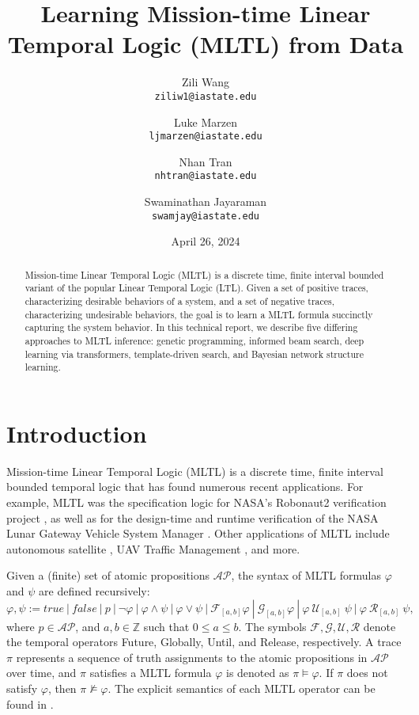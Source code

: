 \documentclass[12pt]{article}
\renewcommand{\phi}{\varphi}
\newcommand{\Until}{\ \mathcal{U}}         %
\newcommand{\Release}{\ \mathcal{R}}       %
\newcommand{\Globally}{\mathcal{G}}          %
\newcommand{\Finally}{\mathcal{F}}           %
\begin{document}
\title{\bf
\large Learning Mission-time Linear Temporal Logic (MLTL) from Data}

\author{
  Zili Wang\\
  \texttt{ziliw1@iastate.edu}
  \and
  Luke Marzen\\
  \texttt{ljmarzen@iastate.edu}
  \and
  Nhan Tran\\
  \texttt{nhtran@iastate.edu}
  \and
  Swaminathan Jayaraman\\
  \texttt{swamjay@iastate.edu}
}

\date{April 26, 2024}

\maketitle

\begin{abstract}
  Mission-time Linear Temporal Logic (MLTL) is a discrete time, finite interval bounded variant of the popular Linear Temporal Logic (LTL). 
  Given a set of positive traces, characterizing desirable behaviors of a system, and a set of negative traces, characterizing undesirable behaviors, the goal is to learn a MLTL formula succinctly capturing the system behavior.
  In this technical report, we describe five differing approaches to MLTL inference: genetic programming, informed beam search, deep learning via transformers, template-driven search, and Bayesian network structure learning.  
\end{abstract}

\section{Introduction}



Mission-time Linear Temporal Logic (MLTL) is a discrete time, finite interval bounded temporal logic that has found numerous recent applications. 
For example, MLTL was the specification logic for NASA's Robonaut2 verification project \cite{KZJZR20}, as well as for the design-time and runtime verification of the NASA Lunar Gateway Vehicle System Manager \cite{DBR21}.
Other applications of MLTL include autonomous satellite \cite{JAXA}, UAV Traffic Management \cite{HCHJR21}, and more. 

Given a (finite) set of atomic propositions $\mathcal{AP}$, the syntax of MLTL formulas $\phi$ and $\psi$ are defined recursively: 
$$ \phi, \psi := true \ | \ false \ | \ p \ | \ \neg \phi \ | \ \phi \land \psi \ | \ \phi \lor \psi \ | \ \Finally_{[a,b]} \phi \ | \ \Globally_{[a,b]} \phi \ | \ \phi \Until_{[a,b]}\ \psi \ | \ \phi \Release_{[a,b]}\ \psi, $$
where $p \in \mathcal{AP}$, and $a, b \in \mathbb{Z}$ such that $0 \leq a \leq b$. 
The symbols $\mathcal{F},\mathcal{G},\mathcal{U},\mathcal{R}$ denote the temporal operators Future, Globally, Until, and Release, respectively.
A trace $\pi$ represents a sequence of truth assignments to the atomic propositions in $\mathcal{AP}$ over time, and $\pi$ satisfies a MLTL formula $\phi$ is denoted as $\pi \models \phi$.
If $\pi$ does not satisfy $\phi$, then $\pi \not\models \phi$.
The explicit semantics of each MLTL operator can be found in \cite{WEST-iFM23}.
\end{document}
